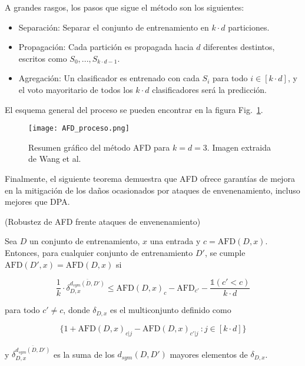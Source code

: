 A grandes rasgos, los pasos que sigue el método son los siguientes:

\begin{itemize}
	\item Separación: Separar el conjunto de entrenamiento en $k \cdot d$ particiones.
	
	\item Propagación: Cada partición es propagada hacia $d$ diferentes destintos, escritos como $S_0,...,S_{k \cdot d -1}$.
	
	\item Agregación: Un clasificador es entrenado con cada $S_i$ para todo $i \in [k \cdot d]$, y el voto mayoritario de todos los $k \cdot d$ clasificadores será la predicción.
\end{itemize}

El esquema general del proceso se pueden encontrar en la figura Fig.~\ref{fig:afd_proc}.

\begin{figure}[h]
    \centering
    \texttt{[image: AFD\_proceso.png]}
    \caption{Resumen gráfico del método AFD para $k=d=3$. Imagen extraida de Wang et al.~\cite{AgregFinita}}
    \label{fig:afd_proc}
\end{figure}

Finalmente, el siguiente teorema demuestra que AFD ofrece garantías de mejora en la mitigación de los daños ocasionados por ataques de envenenamiento, incluso mejores que DPA.

\begin{teorema} (Robustez de AFD frente ataques de envenenamiento)

Sea $D$ un conjunto de entrenamiento, $x$ una entrada y $c = \text{AFD}(D,x)$. Entonces, para cualquier conjunto de entrenamiento $D'$, se cumple $\text{AFD}(D',x)=\text{AFD}(D,x)$ si 

$$\frac{1}{k} \cdot \delta_{D,x}^{\bar{d_{sym}(D,D')}} \leq \text{AFD} (D,x)_c - \text{AFD}_{c'} - \frac{\mathbb{1} \left( c' < c \right)}{k \cdot d}$$

para todo $c' \neq c$, donde $\delta_{D,x}$ es el multiconjunto definido como 

$$\{1 + \text{AFD}(D,x)_{c|j} - \text{AFD}(D,x)_{c' | j}\ : j \in [k \cdot d] \}$$

y $\delta_{D,x}^{\bar{d_{sym}(D,D')}}$ es la suma de los $d_{sym}(D,D')$ mayores elementos de $\delta_{D,x}$.

\end{teorema}

